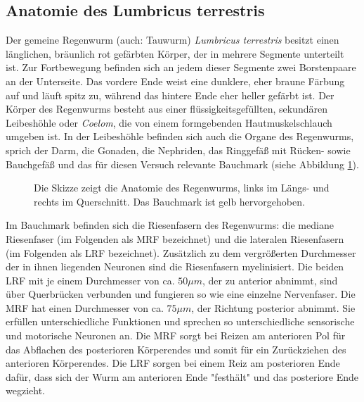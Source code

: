 \documentclass[11pt]{article}
\begin{document}
\subsection{Anatomie des Lumbricus terrestris}\label{anatomie} 
Der gemeine Regenwurm (auch: Tauwurm) \textit{Lumbricus terrestris} besitzt einen länglichen, bräunlich rot gefärbten Körper, der in mehrere Segmente unterteilt ist. Zur Fortbewegung befinden sich an jedem dieser Segmente zwei Borstenpaare an der Unterseite. Das vordere Ende weist eine dunklere, eher braune Färbung auf und läuft spitz zu, während das hintere Ende eher heller gefärbt ist. Der Körper des Regenwurms besteht aus einer flüssigkeitsgefüllten, sekundären Leibeshöhle oder \textit{Coelom}, die von einem formgebenden Hautmuskelschlauch umgeben ist. In der Leibeshöhle befinden sich auch die Organe des Regenwurms, sprich der Darm, die Gonaden, die Nephriden, das Ringgefäß mit Rücken- sowie Bauchgefäß und das für diesen Versuch relevante Bauchmark (siehe Abbildung \ref{bauchmark}). \cite{koerperbau}
\begin{figure}[H]
\caption{Die Skizze zeigt die Anatomie des Regenwurms, links im Längs- und rechts im Querschnitt. Das Bauchmark ist gelb hervorgehoben.}
\label{bauchmark}
\end{figure}
Im Bauchmark befinden sich die Riesenfasern des Regenwurms: die mediane Riesenfaser (im Folgenden als MRF bezeichnet) und die lateralen Riesenfasern (im Folgenden als LRF bezeichnet). Zusätzlich zu dem vergrößerten Durchmesser der in ihnen liegenden Neuronen sind die Riesenfasern myelinisiert. Die beiden LRF mit je einem Durchmesser von ca. $50 \mu m$, der zu anterior abnimmt, sind über Querbrücken verbunden und fungieren so wie eine einzelne Nervenfaser. Die MRF hat einen Durchmesser von ca. $75 \mu m$, der Richtung posterior abnimmt. Sie erfüllen unterschiedliche Funktionen und sprechen so unterschiedliche sensorische und motorische Neuronen an. Die MRF sorgt bei Reizen am anterioren Pol für das Abflachen des posterioren Körperendes und somit für ein Zurückziehen des anterioren Körperendes. Die LRF sorgen bei einem Reiz am posterioren Ende dafür, dass sich der Wurm am anterioren Ende "{}festhält"{} und das posteriore Ende wegzieht.\cite{skript}
\end{document}
